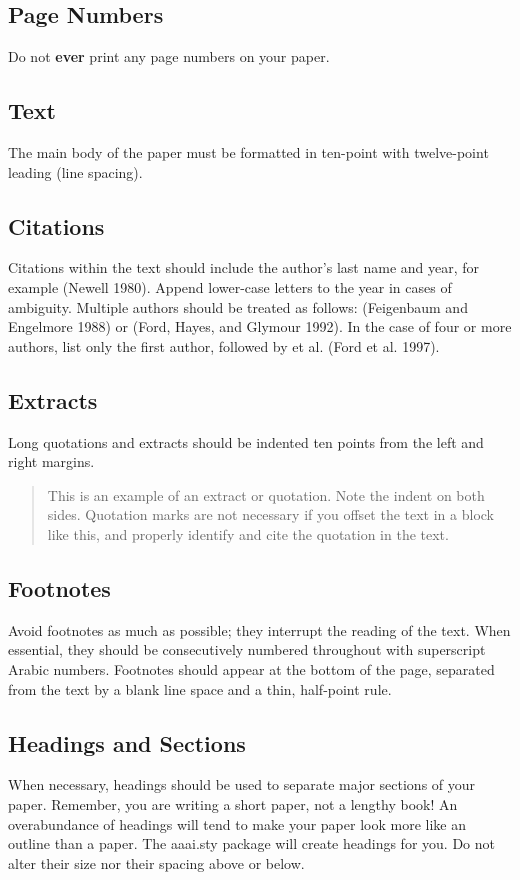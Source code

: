 \documentclass[letterpaper]{article}
\begin{document}
\subsection{Page Numbers}

Do not \textbf{ever} print any page numbers on your paper. 

\subsection{Text }
The main body of the paper must be formatted in ten-point with twelve-point leading (line spacing).

\subsection{Citations}
Citations within the text should include the author's last name and year, for example (Newell 1980). Append lower-case letters to the year in cases of ambiguity. Multiple authors should be treated as follows: (Feigenbaum and Engelmore 1988) or (Ford, Hayes, and Glymour 1992). In the case of four or more authors, list only the first author, followed by et al. (Ford et al. 1997).

\subsection{Extracts}
Long quotations and extracts should be indented ten points from the left and right margins. 

\begin{quote}
This is an example of an extract or quotation. Note the indent on both sides. Quotation marks are not necessary if you offset the text in a block like this, and properly identify and cite the quotation in the text. 

\end{quote}

\subsection{Footnotes}
Avoid footnotes as much as possible; they interrupt the reading of the text. When essential, they should be consecutively numbered throughout with superscript Arabic numbers. Footnotes should appear at the bottom of the page, separated from the text by a blank line space and a thin, half-point rule. 

\subsection{Headings and Sections}
When necessary, headings should be used to separate major sections of your paper. Remember, you are writing a short paper, not a lengthy book! An overabundance of headings will tend to make your paper look more like an outline than a paper. The aaai.sty package will create headings for you. Do not alter their size nor their spacing above or below. 
\end{document}
